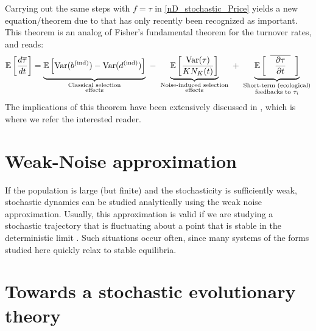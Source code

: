 Carrying out the same steps with $f = \tau$ in \eqref{nD_stochastic_Price} yields a new equation/theorem due to \cite{kuosmanen_turnover_2022} that has only recently been recognized as important. This theorem is an analog of Fisher's fundamental theorem for the turnover rates, and reads:
\begin{equation}
\label{nD_stochastic_Fisher_turnover}
\mathbb{E}\left[\frac{d\overline{\tau}}{dt}\right] = \underbrace{\vphantom{ \mathbb{E}\left[\frac{\textrm{Var}(\tau)}{KN_K(t)}\right] } \mathbb{E}\left[\textrm{Var}(b^{\textrm{(ind)}}) - \textrm{Var}(d^{\textrm{(ind)}})\right]}_{\substack{\text{Classical selection} \\ \text{effects}}} \ - \ \underbrace{ \mathbb{E}\left[\frac{\textrm{Var}(\tau)}{KN_K(t)}\right]}_{\substack{\text{Noise-induced selection} \\ \text{effects}}} \ + \ \underbrace{ \vphantom{ \mathbb{E}\left[\frac{\textrm{Var}(\tau)}{KN_K(t)}\right] } \mathbb{E}\left[\hphantom{a}\overline{\hphantom{a}\frac{\partial \tau}{\partial t}\hphantom{a}}\hphantom{a}\right]}_{\substack{\text{Short-term (ecological)} \\ \text{feedbacks to $\tau_i$}}}
\end{equation}
The implications of this theorem have been extensively discussed in \cite{kuosmanen_turnover_2022}, which is where we refer the interested reader.

\section{Weak-Noise approximation}
If the population is large (but finite) and the stochasticity is sufficiently weak, stochastic dynamics can be studied analytically using the weak noise approximation. Usually, this approximation is valid if we are studying a stochastic trajectory that is fluctuating about a point that is stable in the deterministic limit \citep{van_kampen_stochastic_1981}. Such situations occur often, since many systems of the forms studied here quickly relax to stable equilibria.


\section{Towards a stochastic evolutionary theory}

